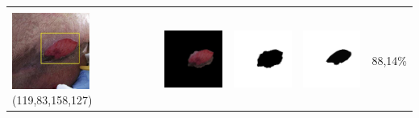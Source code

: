 \begin{table}[H]
\begin{tabular}{|m{1.0in}|m{1.0in}|m{1.0in}|m{1.0in}|m{0.6in}|}
		&  &  & \\
		\includegraphics[width=1.0in]{gambar/hasil_segmentasi/luka_merah/image_25_rect.jpg} {\centering\fontsize{10}{10}\selectfont(119,83,158,127)}&
		\includegraphics[width=1.0in]{gambar/hasil_segmentasi/luka_merah/result_25.jpg}&
		\includegraphics[width=1.0in]{gambar/hasil_segmentasi/luka_merah/mask_r_25.jpg}&
		\includegraphics[width=1.0in]{gambar/hasil_segmentasi/luka_merah/25_r.jpg}&
		88,14\% \\
		\hline


\end{tabular}
\end{table}
